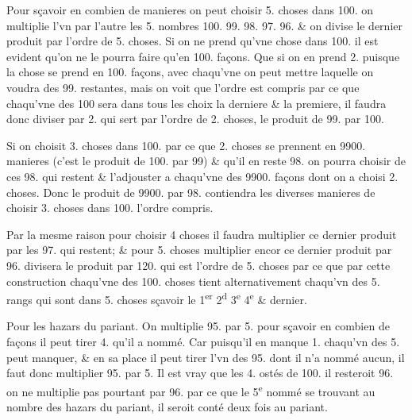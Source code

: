 \documentclass[11pt,a4paper]{article}
\begin{document}
Pour sçavoir en combien de manieres on peut choisir 5. choses dans 100. on multiplie l'vn par l'autre les 5. nombres 100. 99. 98. 97. 96. \& on divise le dernier produit par l'ordre de 5. choses. Si on ne prend qu'vne chose dans 100. il est evident qu'on ne le pourra faire qu'en 100. façons. Que si on en prend 2. puisque la chose \struck{\ill{}} se prend en 100. façons, avec chaqu'vne  on peut mettre \struck{\ill{}} laquelle on voudra des 99. restantes, mais on voit que l'ordre  est \struck{\ill{}} compris par ce que chaqu'vne des 100 sera dans tous les choix la derniere \& la premiere, il faudra donc \struck{\ill{}} diviser par 2. qui sert par l'ordre de 2. choses, le produit de 99. par 100.


Si on choisit 3. choses dans 100. par ce que 2. choses se prennent en 9900. manieres (c'est le produit de 100. par 99) \& qu'il en reste 98. on pourra choisir  de ces 98. qui restent \& l'adjouster a chaqu'vne des 9900. façons dont on a choisi 2. choses. Donc le produit de 9900. par 98. contiendra les diverses manieres de choisir 3. choses dans 100. l'ordre compris.

Par la mesme raison pour choisir 4 choses il faudra multiplier ce dernier produit par les 97. qui restent; \& pour 5. choses multiplier encor ce dernier produit par 96. \struck{\& \ill{}}  divisera le produit par 120. qui est l'ordre de 5. choses par ce que par cette construction chaqu'vne des 100. choses tient alternativement chaqu'vn des 5. rangs qui sont dans 5. choses sçavoir le 1\textsuperscript{er} 2\textsuperscript{d} 3\textsuperscript{e} 4\textsuperscript{e} \& dernier.

Pour les hazars du pariant. On multiplie 95. par 5. pour sçavoir en combien de façons il peut tirer 4. \struck{\ill{}}  qu'il a nommé. Car puisqu'il en manque 1. chaqu'vn des 5. peut manquer, \& en sa place il peut tirer l'vn des 95.  dont il n'a nommé aucun,  il faut donc multiplier  95. par 5.  Il est vray que les 4. ostés de 100. il resteroit 96. on ne multiplie pas pourtant par 96. par ce que le 5\textsuperscript{e} \struck{\ill{}} nommé se trouvant au nombre des hazars du pariant, il  seroit  conté deux fois au pariant.
\end{document}
